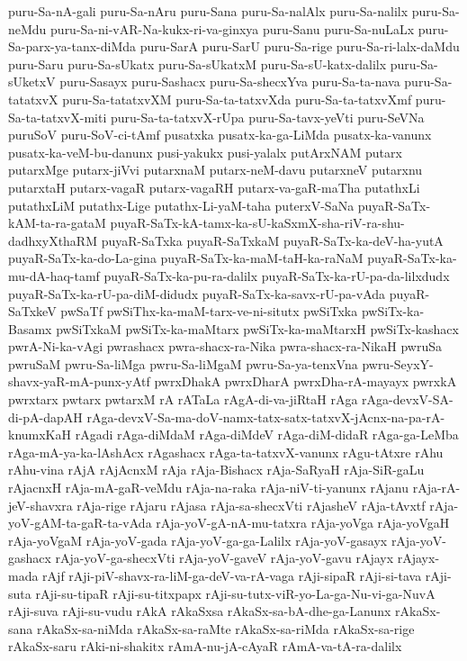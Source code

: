 {puru-Sa-nA-gali
puru-Sa-nAru
puru-Sana
puru-Sa-nalAlx
puru-Sa-nalilx
puru-Sa-neMdu
puru-Sa-ni-vAR-Na-kukx-ri-va-ginxya
puru-Sanu
puru-Sa-nuLaLx
puru-Sa-parx-ya-tanx-diMda
puru-SarA
puru-SarU
puru-Sa-rige
puru-Sa-ri-lalx-daMdu
puru-Saru
puru-Sa-sUkatx
puru-Sa-sUkatxM
puru-Sa-sU-katx-dalilx
puru-Sa-sUketxV
puru-Sasayx
puru-Sashacx
puru-Sa-shecxYva
puru-Sa-ta-nava
puru-Sa-tatatxvX
puru-Sa-tatatxvXM
puru-Sa-ta-tatxvXda
puru-Sa-ta-tatxvXmf
puru-Sa-ta-tatxvX-miti
puru-Sa-ta-tatxvX-rUpa
puru-Sa-tavx-yeVti
puru-SeVNa
puruSoV
puru-SoV-ci-tAmf
pusatxka
pusatx-ka-ga-LiMda
pusatx-ka-vanunx
pusatx-ka-veM-bu-danunx
pusi-yakukx
pusi-yalalx
putArxNAM
putarx
putarxMge
putarx-jiVvi
putarxnaM
putarx-neM-davu
putarxneV
putarxnu
putarxtaH
putarx-vagaR
putarx-vagaRH
putarx-va-gaR-maTha
putathxLi
putathxLiM
putathx-Lige
putathx-Li-yaM-taha
puterxV-SaNa
puyaR-SaTx-kAM-ta-ra-gataM
puyaR-SaTx-kA-tamx-ka-sU-kaSxmX-sha-riV-ra-shu-dadhxyXthaRM
puyaR-SaTxka
puyaR-SaTxkaM
puyaR-SaTx-ka-deV-ha-yutA
puyaR-SaTx-ka-do-La-gina
puyaR-SaTx-ka-maM-taH-ka-raNaM
puyaR-SaTx-ka-mu-dA-haq-tamf
puyaR-SaTx-ka-pu-ra-dalilx
puyaR-SaTx-ka-rU-pa-da-lilxdudx
puyaR-SaTx-ka-rU-pa-diM-didudx
puyaR-SaTx-ka-savx-rU-pa-vAda
puyaR-SaTxkeV
pwSaTf
pwSiThx-ka-maM-tarx-ve-ni-situtx
pwSiTxka
pwSiTx-ka-Basamx
pwSiTxkaM
pwSiTx-ka-maMtarx
pwSiTx-ka-maMtarxH
pwSiTx-kashacx
pwrA-Ni-ka-vAgi
pwrashacx
pwra-shacx-ra-Nika
pwra-shacx-ra-NikaH
pwruSa
pwruSaM
pwru-Sa-liMga
pwru-Sa-liMgaM
pwru-Sa-ya-tenxVna
pwru-SeyxY-shavx-yaR-mA-punx-yAtf
pwrxDhakA
pwrxDharA
pwrxDha-rA-mayayx
pwrxkA
pwrxtarx
pwtarx
pwtarxM
rA
rATaLa
rAgA-di-va-jiRtaH
rAga
rAga-devxV-SA-di-pA-dapAH
rAga-devxV-Sa-ma-doV-namx-tatx-satx-tatxvX-jAcnx-na-pa-rA-knumxKaH
rAgadi
rAga-diMdaM
rAga-diMdeV
rAga-diM-didaR
rAga-ga-LeMba
rAga-mA-ya-ka-lAshAcx
rAgashacx
rAga-ta-tatxvX-vanunx
rAgu-tAtxre
rAhu
rAhu-vina
rAjA
rAjAcnxM
rAja
rAja-Bishacx
rAja-SaRyaH
rAja-SiR-gaLu
rAjacnxH
rAja-mA-gaR-veMdu
rAja-na-raka
rAja-niV-ti-yanunx
rAjanu
rAja-rA-jeV-shavxra
rAja-rige
rAjaru
rAjasa
rAja-sa-shecxVti
rAjasheV
rAja-tAvxtf
rAja-yoV-gAM-ta-gaR-ta-vAda
rAja-yoV-gA-nA-mu-tatxra
rAja-yoVga
rAja-yoVgaH
rAja-yoVgaM
rAja-yoV-gada
rAja-yoV-ga-ga-Lalilx
rAja-yoV-gasayx
rAja-yoV-gashacx
rAja-yoV-ga-shecxVti
rAja-yoV-gaveV
rAja-yoV-gavu
rAjayx
rAjayx-mada
rAjf
rAji-piV-shavx-ra-liM-ga-deV-va-rA-vaga
rAji-sipaR
rAji-si-tava
rAji-suta
rAji-su-tipaR
rAji-su-titxpapx
rAji-su-tutx-viR-yo-La-ga-Nu-vi-ga-NuvA
rAji-suva
rAji-su-vudu
rAkA
rAkaSxsa
rAkaSx-sa-bA-dhe-ga-Lanunx
rAkaSx-sana
rAkaSx-sa-niMda
rAkaSx-sa-raMte
rAkaSx-sa-riMda
rAkaSx-sa-rige
rAkaSx-saru
rAki-ni-shakitx
rAmA-nu-jA-cAyaR
rAmA-va-tA-ra-dalilx
}
